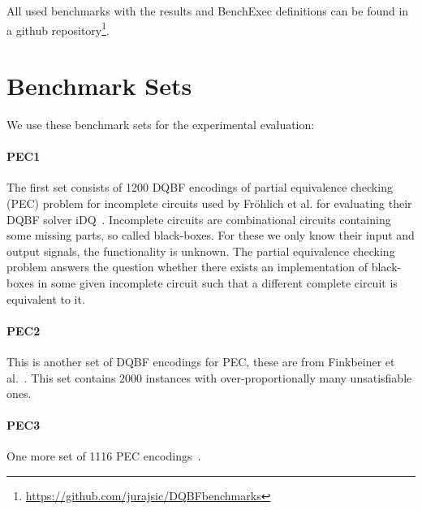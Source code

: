 \documentclass[
  digital, %
  color,
  twoside, %
  table,   %
  nolof,     %
  nolot,     %
]{fithesis3}
\theoremstyle{definition}
\theoremstyle{remark}
\begin{document}
All used benchmarks with the results and BenchExec definitions can be found in a github repository\footnote{\url{https://github.com/jurajsic/DQBFbenchmarks}}.

\section{Benchmark Sets}
We use these benchmark sets for the experimental evaluation:


\paragraph{PEC1}
The first set consists of 1200 DQBF encodings of partial equivalence checking (PEC) problem for incomplete circuits used by Fr\"{o}hlich et al. for evaluating their DQBF solver iDQ~\cite{iDQandDQDIMACS}. Incomplete circuits are combinational circuits containing some missing parts, so called black-boxes. For these we only know their input and output signals, the functionality is unknown. The partial equivalence checking problem answers the question whether there exists an implementation of black-boxes in some given incomplete circuit such that a different complete circuit is equivalent to it.

\paragraph{PEC2}
This is another set of DQBF encodings for PEC, these are from Finkbeiner et al.~\cite{FastDQBFRefutation}. This set contains 2000 instances with over-proportionally many unsatisfiable ones.

\paragraph{PEC3}
One more set of 1116 PEC encodings~\cite{HQSsimpleAlg,PECScholl}.
\end{document}
